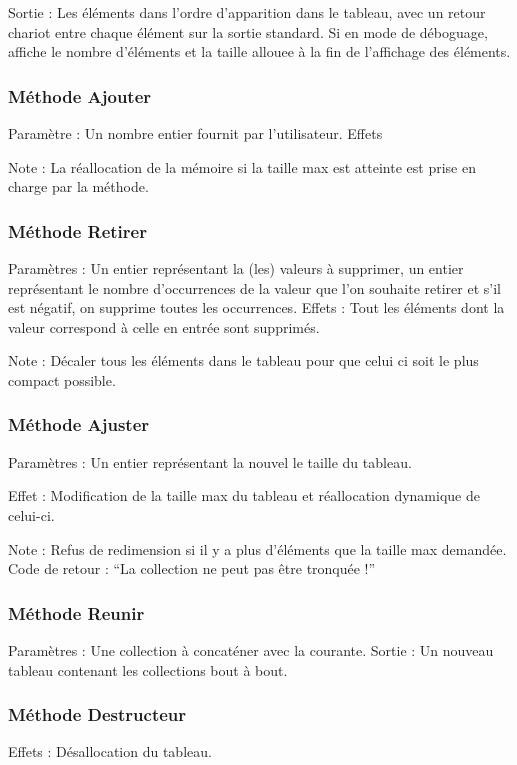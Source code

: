 \documentclass[11pt]{article}
\begin{document}
\noindent Sortie : Les éléments dans l’ordre d’apparition dans le tableau, avec un retour chariot entre chaque élément sur la sortie standard. Si en mode de déboguage, affiche le nombre d’éléments et la taille allouee à la fin de l’affichage des éléments.

\subsubsection*{Méthode Ajouter}
Paramètre : Un nombre entier fournit par l’utilisateur.
Effets

\noindent Note : La réallocation de la mémoire si la taille max est atteinte est prise en charge par la méthode.

\subsubsection*{Méthode Retirer}
Paramètres : Un entier représentant la (les) valeurs à supprimer, un entier représentant le nombre d'occurrences de la valeur que l’on souhaite retirer et s’il est négatif, on supprime toutes les occurrences.
\noindent Effets : Tout les éléments dont la valeur correspond à celle en entrée sont supprimés.

\noindent Note : Décaler tous les éléments dans le tableau pour que celui ci soit le plus compact possible.

\subsubsection*{Méthode Ajuster}
Paramètres : Un entier représentant la nouvel le taille du tableau.

\noindent Effet : Modification de la taille max du tableau et réallocation dynamique de celui-ci.

\noindent Note : Refus de redimension si il y a plus d’éléments que la taille max demandée. Code de retour : “La collection ne peut pas être tronquée !”
    
\subsubsection*{Méthode Reunir}
Paramètres : Une collection à concaténer avec la courante.
\noindent Sortie : Un nouveau tableau contenant les collections bout à bout.

\subsubsection*{Méthode Destructeur}
\noindent Effets : Désallocation du tableau.
\end{document}
